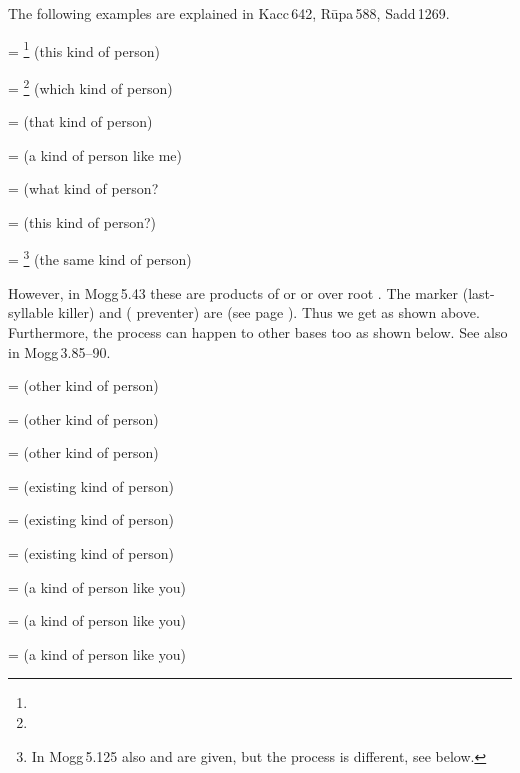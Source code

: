 \medskip
The following examples are explained in Kacc\,642, R\=upa\,588, Sadd\,1269.\label{par:kiidisa}

 = \footnote{} (this kind of person)\par
{} = \footnote{} (which kind of person)\par
{} =  (that kind of person)\par
{} =  (a kind of person like me)\par
{} =  (what kind of person?\par
{} =  (this kind of person?)\par
{} = \footnote{In Mogg\,5.125 also  and  are given, but the process is different, see below.} (the same kind of person)\par

\medskip
However, in Mogg\,5.43 these are products of  or  or  over root . The marker  (last-syllable killer) and  ( preventer) are  (see page \pageref{sec:anubandha}). Thus we get as shown above. Furthermore, the process can happen to other bases too as shown below. See also in Mogg\,3.85--90.

 =  (other kind of person)\par
{} =  (other kind of person)\par
{} =  (other kind of person)\par
{} =  (existing kind of person)\par
{} =  (existing kind of person)\par
{} =  (existing kind of person)\par
{} =  (a kind of person like you)\par
{} =  (a kind of person like you)\par
{} =  (a kind of person like you)\par

